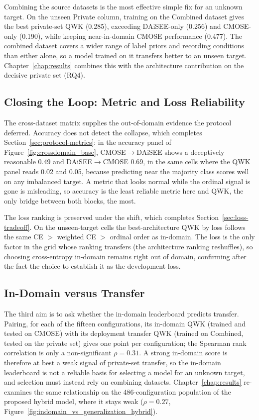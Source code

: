 \documentclass[../main.tex]{subfiles}
\begin{document}
Combining the source datasets is the most effective simple fix for an unknown target. On the unseen Private column, training on the Combined dataset gives the best private-set QWK (0.285), exceeding DAiSEE-only (0.256) and CMOSE-only (0.190), while keeping near-in-domain CMOSE performance (0.477). The combined dataset covers a wider range of label priors and recording conditions than either alone, so a model trained on it transfers better to an unseen target. Chapter~\ref{chap:results} combines this with the architecture contribution on the decisive private set (RQ4).

\subsection{Closing the Loop: Metric and Loss Reliability}
\label{sec:closing-loop}

The cross-dataset matrix supplies the out-of-domain evidence the protocol deferred. Accuracy does not detect the collapse, which completes Section~\ref{sec:protocol-metrics}: in the accuracy panel of Figure~\ref{fig:crossdomain_base}, CMOSE$\rightarrow$DAiSEE shows a deceptively reasonable 0.49 and DAiSEE$\rightarrow$CMOSE 0.69, in the same cells where the QWK panel reads 0.02 and 0.05, because predicting near the majority class scores well on any imbalanced target. A metric that looks normal while the ordinal signal is gone is misleading, so accuracy is the least reliable metric here and QWK, the only bridge between both blocks, the most.

The loss ranking is preserved under the shift, which completes Section~\ref{sec:loss-tradeoff}. On the unseen-target cells the best-architecture QWK by loss follows the same CE $>$ weighted CE $>$ ordinal order as in-domain. The loss is the only factor in the grid whose ranking transfers (the architecture ranking reshuffles), so choosing cross-entropy in-domain remains right out of domain, confirming after the fact the choice to establish it as the development loss.

\subsection{In-Domain versus Transfer}
\label{sec:indomain-vs-transfer}

The third aim is to ask whether the in-domain leaderboard predicts transfer. Pairing, for each of the fifteen configurations, its in-domain QWK (trained and tested on CMOSE) with its deployment transfer QWK (trained on Combined, tested on the private set) gives one point per configuration; the Spearman rank correlation is only a non-significant $\rho=0.31$. A strong in-domain score is therefore at best a weak signal of private-set transfer, so the in-domain leaderboard is not a reliable basis for selecting a model for an unknown target, and selection must instead rely on combining datasets. Chapter~\ref{chap:results} re-examines the same relationship on the 486-configuration population of the proposed hybrid model, where it stays weak ($\rho=0.27$, Figure~\ref{fig:indomain_vs_generalization_hybrid}).
\end{document}
